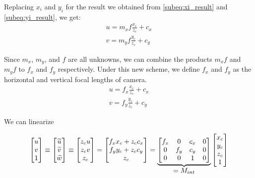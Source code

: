 Replacing $x_i$ and $y_i$ for the result we obtained from \ref{subeq:xi_result} and \ref{subeq:yi_result}, we get:
\begin{align*}
    u = m_x f \frac{x_c}{z_c} + c_x \\
    v = m_y f \frac{y_c}{z_c} + c_y
\end{align*}

Since $m_x$, $m_y$, and $f$ are all unknowns, we can combine the products $m_x f$ and $m_y f$ to $f_x$ and $f_y$ respectively. Under this new scheme, we define $f_x$ and $f_y$ as the horizontal and vertical focal lengths of camera.
\begin{subequations}
    \begin{gather}
        u = f_x \frac{x_c}{z_c} + c_x \\
        v = f_y \frac{y_c}{z_c} + c_y
    \end{gather}
\end{subequations}

We can linearize

\begin{equation}
    \begin{bmatrix}
        u \\ v \\ 1
    \end{bmatrix}
    \equiv
    \begin{bmatrix}
        \widetilde{u} \\ \widetilde{v} \\ \widetilde{w}
    \end{bmatrix}
    \equiv
    \begin{bmatrix}
        z_c u \\ z_c v \\ z_c
    \end{bmatrix}
    =
    \begin{bmatrix}
        f_x x_c + z_c c_x \\ f_y y_c + z_c c_y \\ z_c
    \end{bmatrix}
    =
    \underbrace{
        \begin{bmatrix}
            f_x & 0   & c_x & 0 \\
            0   & f_y & c_y & 0 \\
            0   & 0   & 1   & 0
        \end{bmatrix}
    }_{\mathlarger{=M_{int}}}
    \begin{bmatrix}
        x_c \\ y_c \\ z_c \\ 1
    \end{bmatrix}
\end{equation}
